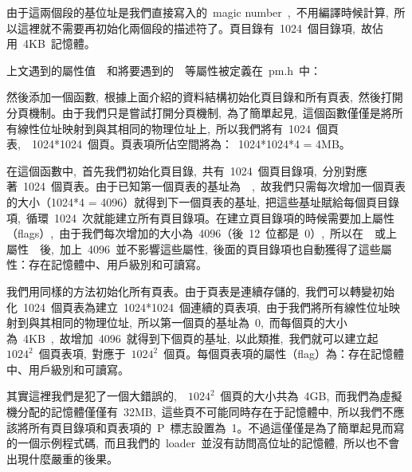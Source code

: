 由于這兩個段的基位址是我們直接寫入的~magic number~,~不用編譯時候計算,~所以這裡就不需要再初始化兩個段的描述符了。頁目錄有~1024~個目錄項,~故佔用~4KB~記憶體。

上文遇到的屬性值~~和將要遇到的~~等屬性被定義在~pm.h~中：


然後添加一個函數,~根據上面介紹的資料結構初始化頁目錄和所有頁表,~然後打開分頁機制。由于我們只是嘗試打開分頁機制,~為了簡單起見,~這個函數僅僅是將所有線性位址映射到與其相同的物理位址上,~所以我們將有~1024~個頁表,~~1024*1024~個頁。頁表項所佔空間將為：~1024*1024*4 = 4MB。


在這個函數中,~首先我們初始化頁目錄,~共有~1024~個頁目錄項,~分別對應著~1024~個頁表。由于已知第一個頁表的基址為~~,~故我們只需每次增加一個頁表的大小（1024*4 = 4096）就得到下一個頁表的基址,~把這些基址賦給每個頁目錄項,~循環~1024~次就能建立所有頁目錄項。在建立頁目錄項的時候需要加上屬性（flags）,~由于我們每次增加的大小為~4096（後~12~位都是~0）,~所以在~~或上屬性~~後,~加上~4096~並不影響這些屬性,~後面的頁目錄項也自動獲得了這些屬性：存在記憶體中、用戶級別和可讀寫。

我們用同樣的方法初始化所有頁表。由于頁表是連續存儲的,~我們可以轉變初始化~1024~個頁表為建立~1024*1024~個連續的頁表項,~由于我們將所有線性位址映射到與其相同的物理位址,~所以第一個頁的基址為~0,~而每個頁的大小為~4KB~,~故增加~4096~就得到下個頁的基址,~以此類推,~我們就可以建立起~$1024^2$~個頁表項,~對應于~$1024^2$~個頁。每個頁表項的屬性（flag）為：存在記憶體中、用戶級別和可讀寫。

其實這裡我們是犯了一個大錯誤的,~~$1024^2$~個頁的大小共為~4GB,~而我們為虛擬機分配的記憶體僅僅有~32MB,~這些頁不可能同時存在于記憶體中,~所以我們不應該將所有頁目錄項和頁表項的~P~標志設置為~1。不過這僅僅是為了簡單起見而寫的一個示例程式碼,~而且我們的~loader~並沒有訪問高位址的記憶體,~所以也不會出現什麼嚴重的後果。

